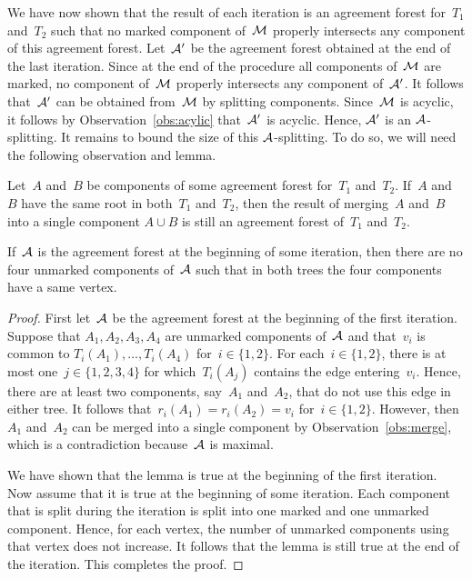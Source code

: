 We have now shown that the result of each iteration is an agreement forest for~$T_1$ and~$T_2$ such that no marked component of~${\mathcal M}$ properly intersects any component of this agreement forest. Let~${\mathcal A}'$ be the agreement forest obtained at the end of the last iteration. Since at the end of the procedure all components of~${\mathcal M}$ are marked, no component of~${\mathcal M}$ properly intersects any component of~${\mathcal A}'$. It follows that~${\mathcal A}'$ can be obtained from~${\mathcal M}$ by splitting components. Since~${\mathcal M}$ is acyclic, it follows by Observation~\ref{obs:acylic} that~${\mathcal A}'$ is acyclic. Hence, ${\mathcal A}'$ is an ${\mathcal A}$-splitting. It remains to bound the size of this ${\mathcal A}$-splitting. To do so, we will need the following observation and lemma.

\begin{observation}\label{obs:merge}
Let~$A$ and~$B$ be components of some agreement forest for~$T_1$ and~$T_2$. If~$A$ and~$B$ have the same root in both~$T_1$ and~$T_2$, then the result of merging~$A$ and~$B$ into a single component $A\cup B$ is still an agreement forest of~$T_1$ and~$T_2$.
\end{observation}

\begin{lemma}
\label{lem:maximal} If~${\mathcal A}$ is the agreement forest at the beginning of some iteration, then there are no four unmarked components of~${\mathcal A}$ {such that in both trees the four components have a same vertex}.
\end{lemma}
\begin{proof}
First let~${\mathcal A}$ be the agreement forest at the beginning of the first iteration. Suppose that $A_1,A_2,A_3,A_4$ are unmarked components of~${\mathcal A}$ and that~$v_i$ is common to $T_i(A_1),\ldots ,T_i(A_4)$ for~$i\in\{1,2\}$. For each~$i\in\{1,2\}$, there is at most one~$j\in\{1,2,3,4\}$ for which~$T_i(A_j)$ contains the edge entering~$v_i$. Hence, there are at least two components, say~$A_1$ and~$A_2$, that do not use this edge in either tree. It follows that~$r_i(A_1)=r_i(A_2)=v_i$ for~$i\in\{1,2\}$. However, then~$A_1$ and~$A_2$ can be merged into a single component by Observation~\ref{obs:merge}, which is a contradiction because~${\mathcal A}$ is maximal.

We have shown that the lemma is true at the beginning of the first iteration. Now assume that it is true at the beginning of some iteration. Each component that is split during the iteration is split into one marked and one unmarked component. Hence, for each vertex, the number of unmarked components using that vertex does not increase. It follows that the lemma is still true at the end of the iteration. This completes the proof.
\end{proof}

